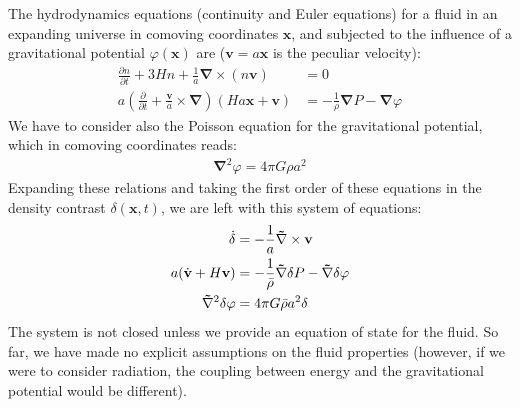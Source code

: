  The hydrodynamics equations (continuity and Euler equations) for a fluid in an expanding universe in comoving coordinates $\mathbf{x}$, and subjected to the influence of a gravitational potential $\varphi(\mathbf{x})$ are ($\mathbf{v}=a\mathbf{x}$ is the peculiar velocity):
 \begin{subequations}
 \begin{align}
    \frac{\partial n}{\partial t} + 3Hn + \frac{1}{a}\mathbf{\nabla}\times(n\mathbf{v}) &= 0 \label{eq:mass_cons} \\
    a\left(\frac{\partial }{\partial t} + \frac{\mathbf{v}}{a}\times\mathbf{\nabla}\right)(Ha\mathbf{x}+\mathbf{v}) &= -\frac{1}{\rho}\mathbf{\nabla} P - \mathbf{\nabla}\varphi \label{eq:euler}
 \end{align} 
 \end{subequations}
 We have to consider also the Poisson equation for the gravitational potential, which in comoving coordinates reads:
 \begin{align}
 \mathbf{\nabla}^2 \varphi = 4\pi G \rho a^2 \label{eq:poisson}
 \end{align} 
 Expanding these relations and taking the first order of these equations in the density contrast $\delta(\mathbf{x},t)$, we are left with this system of equations:
 \begin{subequations}
 \begin{align}
    \Dot{\delta} &= - \frac{1}{a}\mathbf{\nabla}\times \mathbf{v}\label{eq:euler_linearized1}\\
    a(\Dot{\mathbf{v}}+H\mathbf{v}) &= -\frac{1}{\Bar{\rho}}\mathbf{\nabla}\delta P - \mathbf{\nabla}\delta\varphi\label{eq:euler_linearized2}\\
    \mathbf{\nabla}^2\delta\varphi &= 4\pi G\Bar{\rho}a^2\delta \label{eq:euler_linearized3}
 \end{align} 
 \end{subequations}
 The system is not closed unless we provide an equation of state for the fluid. So far, we have made no explicit assumptions on the fluid properties (however, if we were to consider radiation, the coupling between energy and the gravitational potential would be different). 
 
